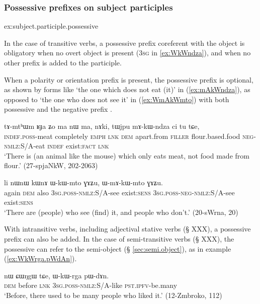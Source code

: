 \subsubsection{Possessive prefixes on subject participles}  {ex:subject.participle.possessive}

In the case of transitive verbs, a possessive prefix coreferent with the object is obligatory when no overt object is present (\textsc{3sg}  in \ref{ex:WkWndza}), and when no other prefix is added to the participle.

When a polarity or orientation prefix is present, the possessive prefix is optional, as shown by forms like  `the one which does not eat (it)' in (\ref{ex:mAkWndza}), as opposed to  `the one who does not see it' in (\ref{ex:WmAkWmto}) with both possessive  and the negative prefix .

 \begin{exe} 
\ex \label{ex:mAkWndza}
\gll  tɤ-mtʰɯm ʁɟa ʑo ma nɯ ma, nɤki, tɯjpu mɤ-kɯ-ndza ci tu tɕe, \\
\textsc{indef}.\textsc{poss}-meat completely \textsc{emph} \textsc{lnk} \textsc{dem} apart.from \textsc{filler} flour.based.food \textsc{neg}-\textsc{nmlz}:S/A-eat \textsc{indef} exist:\textsc{fact} \textsc{lnk} \\
\glt  `There is (an animal like the mouse) which only eats meat, not food made from flour.' (27-spjaNkW, 202-2063)
\end{exe}

 \begin{exe} 
\ex \label{ex:WmAkWmto}
\gll  li nɯnɯ kɯnɤ ɯ-kɯ-mto ɣɤʑu, ɯ-mɤ-kɯ-mto ɣɤʑu. \\
again \textsc{dem} also \textsc{3sg}.\textsc{poss}-\textsc{nmlz}:S/A-see exist:\textsc{sens} \textsc{3sg}.\textsc{poss}-\textsc{neg}-\textsc{nmlz}:S/A-see exist:\textsc{sens} \\
\glt `There are (people) who see (find) it, and people who don't.' (20-sWrna, 20)
\end{exe}

With intransitive verbs, including adjectival stative verbs (§ XXX), a possessive prefix can also be added. In the case of semi-transitive verbs (§ XXX), the possessive can refer to the semi-object (§ \ref{sec:semi.object}), as in example (\ref{ex:WkWrga.pWdAn}).

 \begin{exe} 
\ex \label{ex:WkWrga.pWdAn}
\gll  nɯ ɕɯŋgɯ tɕe, ɯ-kɯ-rga pɯ-dɤn. \\
\textsc{dem} before \textsc{lnk} \textsc{3sg}.\textsc{poss}-\textsc{nmlz}:S/A-like \textsc{pst}.\textsc{ipfv}-be.many \\
\glt  `Before, there used to be many people who liked it.' (12-Zmbroko, 112)
\end{exe}

